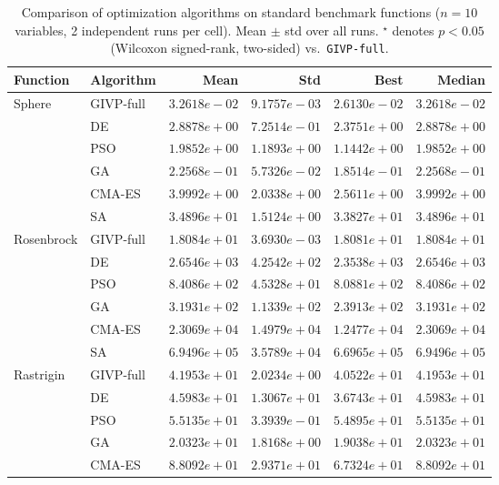 
\begin{table}[htb]
\centering
\caption{Comparison of optimization algorithms on standard benchmark functions ($n=10$ variables, 2 independent runs per cell). Mean $\pm$ std over all runs. $^\star$ denotes $p < 0.05$ (Wilcoxon signed-rank, two-sided) vs.\ \texttt{GIVP-full}.}
\label{tab:benchmark_comparison}
\begin{tabular}{llrrrr}
\toprule
Function & Algorithm & Mean & Std & Best & Median \\
\midrule
  \multirow{6}{*}{Sphere} & GIVP-full & $3.2618e-02$ & $9.1757e-03$ & $2.6130e-02$ & $3.2618e-02$ \\
   & DE & $2.8878e+00$ & $7.2514e-01$ & $2.3751e+00$ & $2.8878e+00$ \\
   & PSO & $1.9852e+00$ & $1.1893e+00$ & $1.1442e+00$ & $1.9852e+00$ \\
   & GA & $2.2568e-01$ & $5.7326e-02$ & $1.8514e-01$ & $2.2568e-01$ \\
   & CMA-ES & $3.9992e+00$ & $2.0338e+00$ & $2.5611e+00$ & $3.9992e+00$ \\
   & SA & $3.4896e+01$ & $1.5124e+00$ & $3.3827e+01$ & $3.4896e+01$ \\
\midrule
  \multirow{6}{*}{Rosenbrock} & GIVP-full & $1.8084e+01$ & $3.6930e-03$ & $1.8081e+01$ & $1.8084e+01$ \\
   & DE & $2.6546e+03$ & $4.2542e+02$ & $2.3538e+03$ & $2.6546e+03$ \\
   & PSO & $8.4086e+02$ & $4.5328e+01$ & $8.0881e+02$ & $8.4086e+02$ \\
   & GA & $3.1931e+02$ & $1.1339e+02$ & $2.3913e+02$ & $3.1931e+02$ \\
   & CMA-ES & $2.3069e+04$ & $1.4979e+04$ & $1.2477e+04$ & $2.3069e+04$ \\
   & SA & $6.9496e+05$ & $3.5789e+04$ & $6.6965e+05$ & $6.9496e+05$ \\
\midrule
  \multirow{6}{*}{Rastrigin} & GIVP-full & $4.1953e+01$ & $2.0234e+00$ & $4.0522e+01$ & $4.1953e+01$ \\
   & DE & $4.5983e+01$ & $1.3067e+01$ & $3.6743e+01$ & $4.5983e+01$ \\
   & PSO & $5.5135e+01$ & $3.3939e-01$ & $5.4895e+01$ & $5.5135e+01$ \\
   & GA & $2.0323e+01$ & $1.8168e+00$ & $1.9038e+01$ & $2.0323e+01$ \\
   & CMA-ES & $8.8092e+01$ & $2.9371e+01$ & $6.7324e+01$ & $8.8092e+01$ \\

\end{tabular}
\end{table}
